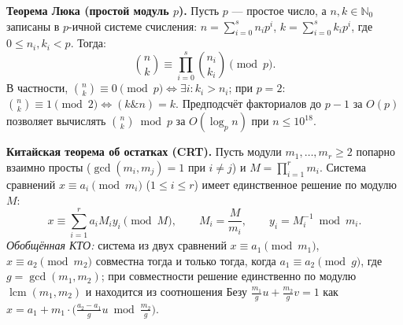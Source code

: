 \documentclass[10pt,a4paper]{article}
\renewcommand{\le}{\leqslant}
\renewcommand{\ge}{\geqslant}
\newcommand{\N}{\mathbb{N}}
\DeclareMathOperator{\lcm}{lcm}
\begin{document}
\textbf{Теорема Люка (простой модуль $p$).} Пусть $p$ — простое число, а $n, k \in \N_0$ записаны в $p$-ичной системе счисления: $n = \sum_{i=0}^s n_i p^i$, $k = \sum_{i=0}^s k_i p^i$, где $0 \le n_i, k_i < p$. Тогда:
\[
  \binom{n}{k} \equiv \prod_{i=0}^{s} \binom{n_i}{k_i} \pmod p.
\]
В частности, $\binom{n}{k} \equiv 0 \pmod p \iff \exists i : k_i > n_i$; при $p = 2$: $\binom{n}{k} \equiv 1 \pmod 2 \iff (k \mathbin{\&} n) = k$. Предподсчёт факториалов до $p - 1$ за $O(p)$ позволяет вычислять $\binom{n}{k} \bmod p$ за $O(\log_p n)$ при $n \le 10^{18}$.

\textbf{Китайская теорема об остатках (CRT).} Пусть модули $m_1, \dots, m_r \ge 2$ попарно взаимно просты ($\gcd(m_i, m_j) = 1$ при $i \ne j$) и $M = \prod_{i=1}^r m_i$. Система сравнений $x \equiv a_i \pmod{m_i}$ ($1 \le i \le r$) имеет единственное решение по модулю $M$:
\[
  x \equiv \sum_{i=1}^{r} a_i M_i y_i \pmod M, \qquad M_i = \frac{M}{m_i}, \qquad y_i = M_i^{-1} \bmod m_i.
\]
\emph{Обобщённая КТО:} система из двух сравнений $x \equiv a_1 \pmod{m_1}$, $x \equiv a_2 \pmod{m_2}$ совместна тогда и только тогда, когда $a_1 \equiv a_2 \pmod g$, где $g = \gcd(m_1, m_2)$; при совместности решение единственно по модулю $\lcm(m_1, m_2)$ и находится из соотношения Безу $\frac{m_1}{g} u + \frac{m_2}{g} v = 1$ как $x = a_1 + m_1 \cdot \bigl(\frac{a_2 - a_1}{g} u \bmod \frac{m_2}{g}\bigr)$.
\end{document}
